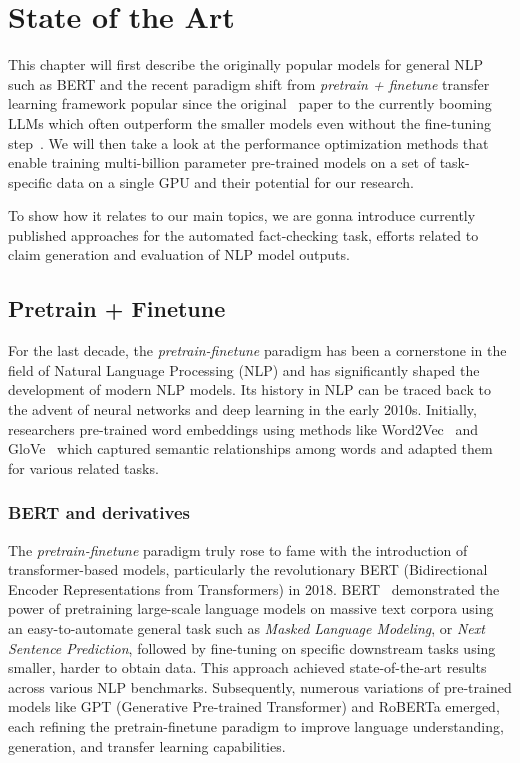
\chapter{State of the Art}

This chapter will first describe the originally popular models for general NLP such as BERT and the recent paradigm shift from \textit{pretrain + finetune} transfer learning framework popular since the original~\cite{devlin2019bert} paper to the currently booming LLMs which often outperform the smaller models even without the fine-tuning step~\cite{gpt4,llama,vicuna}. We will then take a look at the performance optimization methods that enable training multi-billion parameter pre-trained models on a set of task-specific data on a single GPU and their potential for our research. 

To show how it relates to our main topics, we are gonna introduce currently published approaches for the automated fact-checking task, efforts related to claim generation and evaluation of NLP model outputs.

\label{chap:sota}
\section{Pretrain + Finetune}
\label{sec:pretrain}
For the last decade, the \textit{pretrain-finetune} paradigm has been a cornerstone in the field of Natural Language Processing (NLP) and has significantly shaped the development of modern NLP models. Its history in NLP can be traced back to the advent of neural networks and deep learning in the early 2010s. Initially, researchers pre-trained word embeddings using methods like Word2Vec~\cite{mikolov} and GloVe~\cite{pennington-etal-2014-glove} which captured semantic relationships among words and adapted them for various related tasks.

\subsection{BERT and derivatives}
The \textit{pretrain-finetune} paradigm truly rose to fame with the introduction of transformer-based models, particularly the revolutionary BERT (Bidirectional Encoder Representations from Transformers) in 2018. BERT~\cite{devlin2019bert} demonstrated the power of pretraining large-scale language models on massive text corpora using an easy-to-automate general task such as \textit{Masked Language Modeling}, or \textit{Next Sentence Prediction}, followed by fine-tuning on specific downstream tasks using smaller, harder to obtain data. This approach achieved state-of-the-art results across various NLP benchmarks. Subsequently, numerous variations of pre-trained models like GPT (Generative Pre-trained Transformer) and RoBERTa emerged, each refining the pretrain-finetune paradigm to improve language understanding, generation, and transfer learning capabilities. 

